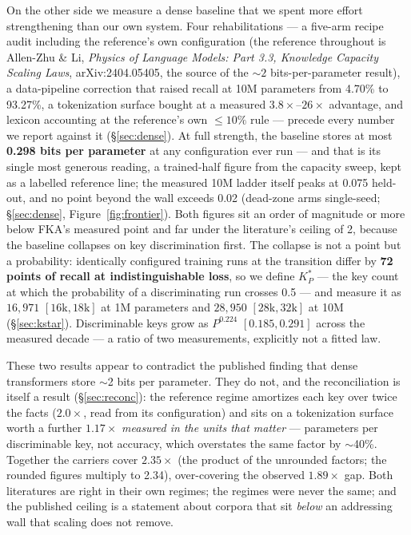 On the other side we measure a dense baseline that we spent more effort strengthening than our own system. Four rehabilitations --- a five-arm recipe audit including the reference's own configuration (the reference throughout is Allen-Zhu \& Li, \emph{Physics of Language Models: Part 3.3, Knowledge Capacity Scaling Laws}, arXiv:2404.05405, the source of the ${\sim}2$ bits-per-parameter result), a data-pipeline correction that raised recall at 10M parameters from 4.70\% to 93.27\%, a tokenization surface bought at a measured $3.8\times$--$26\times$ advantage, and lexicon accounting at the reference's own $\le 10\%$ rule --- precede every number we report against it (\S\ref{sec:dense}). %
At full strength, the baseline stores at most \textbf{0.298 bits per parameter} at any configuration ever run --- and that is its single most generous reading, a trained-half figure from the capacity sweep, kept as a labelled reference line; the measured 10M ladder itself peaks at 0.075 held-out, and no point beyond the wall exceeds 0.02 (dead-zone arms single-seed; \S\ref{sec:dense}, Figure~\ref{fig:frontier}). %
Both figures sit an order of magnitude or more below FKA's measured point and far under the literature's ceiling of 2, because the baseline collapses on key discrimination first. The collapse is not a point but a probability: identically configured training runs at the transition differ by \textbf{72 points of recall at indistinguishable loss}, so we define $K^*_P$ --- the key count at which the probability of a discriminating run crosses 0.5 --- and measure it as $16{,}971$ $[16\text{k},18\text{k}]$ at 1M parameters and $28{,}950$ $[28\text{k},32\text{k}]$ at 10M (\S\ref{sec:kstar}). %
Discriminable keys grow as $P^{0.224}$ $[0.185, 0.291]$ across the measured decade --- a ratio of two measurements, explicitly not a fitted law.

These two results appear to contradict the published finding that dense transformers store $\sim$2 bits per parameter. They do not, and the reconciliation is itself a result (\S\ref{sec:reconc}): the reference regime amortizes each key over twice the facts ($2.0\times$, read from its configuration) and sits on a tokenization surface worth a further $1.17\times$ \emph{measured in the units that matter} --- parameters per discriminable key, not accuracy, which overstates the same factor by $\sim$40\%. Together the carriers cover $2.35\times$ (the product of the unrounded factors; the rounded figures multiply to 2.34), over-covering the observed $1.89\times$ gap. Both literatures are right in their own regimes; the regimes were never the same; and the published ceiling is a statement about corpora that sit \emph{below} an addressing wall that scaling does not remove.

